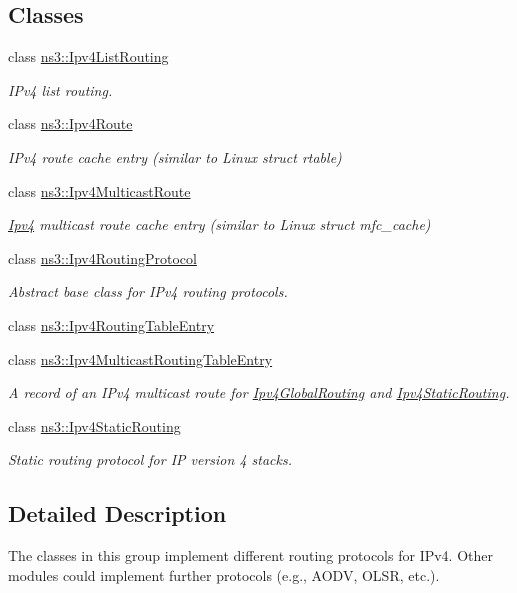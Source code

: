 \subsection*{Classes}
\begin{DoxyCompactItemize}
\item 
class \hyperlink{classns3_1_1Ipv4ListRouting}{ns3\+::\+Ipv4\+List\+Routing}
\begin{DoxyCompactList}\small\item\em I\+Pv4 list routing. \end{DoxyCompactList}\item 
class \hyperlink{classns3_1_1Ipv4Route}{ns3\+::\+Ipv4\+Route}
\begin{DoxyCompactList}\small\item\em I\+Pv4 route cache entry (similar to Linux struct rtable) \end{DoxyCompactList}\item 
class \hyperlink{classns3_1_1Ipv4MulticastRoute}{ns3\+::\+Ipv4\+Multicast\+Route}
\begin{DoxyCompactList}\small\item\em \hyperlink{classns3_1_1Ipv4}{Ipv4} multicast route cache entry (similar to Linux struct mfc\+\_\+cache) \end{DoxyCompactList}\item 
class \hyperlink{classns3_1_1Ipv4RoutingProtocol}{ns3\+::\+Ipv4\+Routing\+Protocol}
\begin{DoxyCompactList}\small\item\em Abstract base class for I\+Pv4 routing protocols. \end{DoxyCompactList}\item 
class \hyperlink{classns3_1_1Ipv4RoutingTableEntry}{ns3\+::\+Ipv4\+Routing\+Table\+Entry}
\item 
class \hyperlink{classns3_1_1Ipv4MulticastRoutingTableEntry}{ns3\+::\+Ipv4\+Multicast\+Routing\+Table\+Entry}
\begin{DoxyCompactList}\small\item\em A record of an I\+Pv4 multicast route for \hyperlink{classns3_1_1Ipv4GlobalRouting}{Ipv4\+Global\+Routing} and \hyperlink{classns3_1_1Ipv4StaticRouting}{Ipv4\+Static\+Routing}. \end{DoxyCompactList}\item 
class \hyperlink{classns3_1_1Ipv4StaticRouting}{ns3\+::\+Ipv4\+Static\+Routing}
\begin{DoxyCompactList}\small\item\em Static routing protocol for IP version 4 stacks. \end{DoxyCompactList}\end{DoxyCompactItemize}


\subsection{Detailed Description}
The classes in this group implement different routing protocols for I\+Pv4. Other modules could implement further protocols (e.\+g., A\+O\+DV, O\+L\+SR, etc.). 